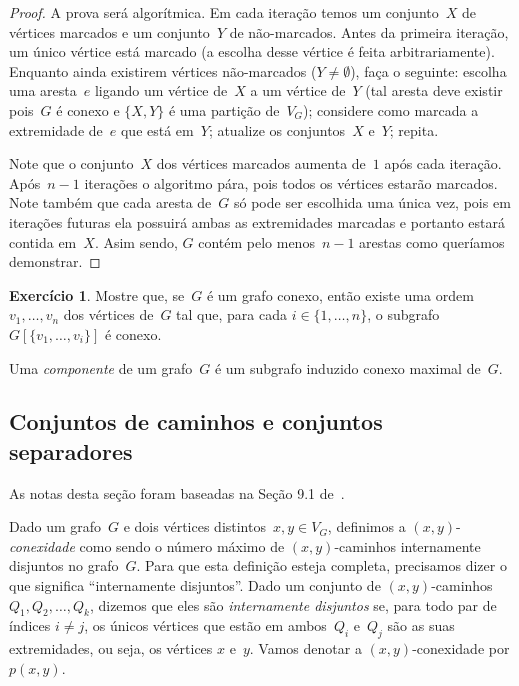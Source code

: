 \documentclass[12pt, a4paper]{article}
\theoremstyle{definition}
\newtheorem{exer}{Exercício}
\begin{document}
\begin{proof}
A prova será algorítmica. Em cada iteração temos um conjunto~$X$ de vértices marcados e um conjunto~$Y$ de não-marcados. Antes da primeira iteração, um único vértice está marcado (a escolha desse vértice é feita arbitrariamente). Enquanto ainda existirem vértices não-marcados ($Y \neq \emptyset$), faça o seguinte: escolha uma aresta~$e$ ligando um vértice de~$X$ a um vértice de~$Y$ (tal aresta deve existir pois~$G$ é conexo e $\{X,Y\}$ é uma partição de~$V_G$); considere como marcada a extremidade de~$e$ que está em~$Y$; atualize os conjuntos~$X$ e~$Y$; repita.

Note que o conjunto~$X$ dos vértices marcados aumenta de~$1$ após cada iteração. Após~$n - 1$ iterações o algoritmo pára, pois todos os vértices estarão marcados. Note também que cada aresta de~$G$ só pode ser escolhida uma única vez, pois em iterações futuras
ela possuirá ambas as extremidades marcadas e portanto estará contida em~$X$. Asim sendo, $G$ contém pelo menos~$n - 1$ arestas como queríamos demonstrar.
\end{proof}

\begin{exer}
Mostre que, se~$G$ é um grafo conexo, então existe uma ordem~$v_1, \dots, v_n$ dos vértices de~$G$ tal que, para cada $i \in \{1,\dots,n\}$, o subgrafo $G[\{v_1,\dots,v_i\}]$ %
é conexo.
\end{exer}

Uma \emph{componente} de um grafo~$G$ é um subgrafo induzido conexo maximal de~$G$. 

\subsection {Conjuntos de caminhos e conjuntos separadores }

As notas desta seção foram baseadas na Seção 9.1 de~\cite{BondyMurty}. 

Dado um grafo~$G$ e dois vértices distintos~$x,y \in V_G$, definimos a $(x,y)$-\emph{conexidade} como sendo o número máximo de $(x,y)$-caminhos internamente disjuntos no grafo~$G$. Para que esta definição esteja completa, precisamos dizer o que significa ``internamente disjuntos''. Dado um conjunto de $(x,y)$-caminhos $Q_1, Q_2, \dots, Q_k$, dizemos que eles são \emph{internamente disjuntos} se, para todo par de índices $i \neq j$, os únicos vértices que estão em ambos~$Q_i$ e~$Q_j$ são as suas extremidades, ou seja, os vértices $x$ e~$y$. Vamos denotar a $(x,y)$-conexidade por $p(x,y)$.
\end{document}
